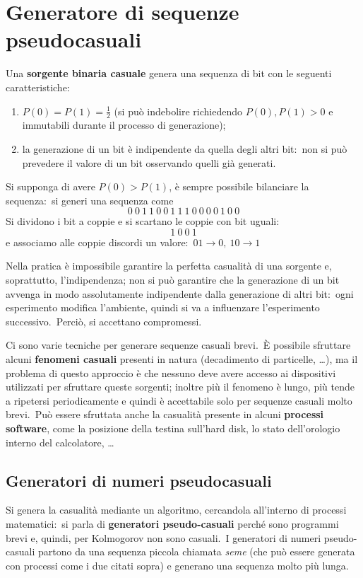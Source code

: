 \chapter{Generatore di sequenze pseudocasuali}

Una \textbf{sorgente binaria casuale} genera una sequenza di bit con le seguenti caratteristiche:

\begin{enumerate}
    \item $P(0) = P(1) = \frac{1}{2}$ (si può indebolire richiedendo $P(0), P(1) > 0$ e immutabili durante il processo di generazione);
    \item la generazione di un bit è indipendente da quella degli altri bit:\ non si può prevedere il valore di un bit osservando quelli già generati.\
\end{enumerate}

\noindent Si supponga di avere $P(0)>P(1)$, è sempre possibile bilanciare la sequenza:\ si generi una sequenza come
\[0\ 0\ 1\ 1\ 0\ 0\ 1\ 1\ 1\ 0\ 0\ 0\ 0\ 1\ 0\ 0\]
Si dividono i bit a coppie e si scartano le coppie con bit uguali:
\[1\ 0\ 0\ 1\]
e associamo alle coppie discordi un valore:\ $01 \rightarrow 0,\ 10\rightarrow 1$

Nella pratica è impossibile garantire la perfetta casualità di una sorgente e, soprattutto, l'indipendenza; non si può garantire che la generazione di un bit avvenga in modo assolutamente indipendente dalla generazione di altri bit:\ ogni esperimento modifica l'ambiente, quindi si va a influenzare l'esperimento successivo.\
Perciò, si accettano compromessi.\

Ci sono varie tecniche per generare sequenze casuali brevi.\
È possibile sfruttare alcuni \textbf{fenomeni casuali} presenti in natura (decadimento di particelle, \dots), ma il problema di questo approccio è che nessuno deve avere accesso ai dispositivi utilizzati per sfruttare queste sorgenti; inoltre più il fenomeno è lungo, più tende a ripetersi periodicamente e quindi è accettabile solo per sequenze casuali molto brevi.\
Può essere sfruttata anche la casualità presente in alcuni \textbf{processi software}, come la posizione della testina sull'hard disk, lo stato dell'orologio interno del calcolatore, \dots

\section{Generatori di numeri pseudocasuali}

Si genera la casualità mediante un algoritmo, cercandola all'interno di processi matematici:\ si parla di \textbf{generatori pseudo-casuali} perché sono programmi brevi e, quindi, per Kolmogorov non sono casuali.\
I generatori di numeri pseudo-casuali partono da una sequenza piccola chiamata \textit{seme} (che può essere generata con processi come i due citati sopra) e generano una sequenza molto più lunga.\

